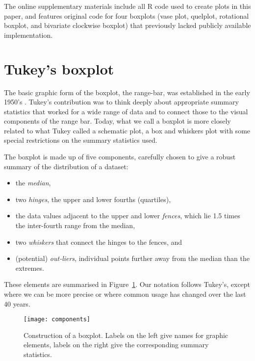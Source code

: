 \documentclass[oneside]{article}
\begin{document}
The online supplementary materials include all R code \citep{R} used to create plots in this paper, and features original code for four boxplots (vase plot, quelplot, rotational boxplot, and bivariate clockwise boxplot) that previously lacked publicly available implementation.

\section{Tukey's boxplot}
\label{sec:tukey}

The basic graphic form of the boxplot, the range-bar, was established in the early 1950's \citet[pg. 164]{spear:1952}. Tukey's contribution was to think deeply about appropriate summary statistics that worked for a wide range of data and to connect those to the visual components of the range bar. Today, what we call a boxplot is more closely related to what Tukey called a schematic plot, a box and whiskers plot with some special restrictions on the summary statistics used. %

The boxplot is made up of five components, carefully chosen to give a robust summary of the distribution of a dataset:

\begin{itemize}

\item the \emph{median},

\item two \emph{hinges}, the upper and lower fourths (quartiles),

\item the data values adjacent to the upper and lower \emph{fences}, which lie 1.5 times the inter-fourth range from the median,

\item two \emph{whiskers} that connect the hinges to the fences, and

\item (potential) \emph{out-liers}, individual points further away from the median than the extremes.

\end{itemize}

\noindent These elements are summarised in Figure~\ref{fig:construction}. Our notation follows Tukey's, except where we can be more precise or where common usage has changed over the last 40 years. 

\begin{figure}[htbp]
  \centering
  \texttt{[image: components]}
  \caption{Construction of a boxplot.  Labels on the left give names for graphic elements, labels on the right give the corresponding summary statistics.}
  \label{fig:construction}
\end{figure}
\end{document}
